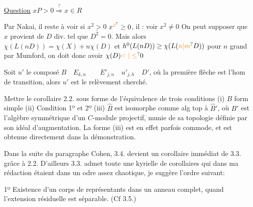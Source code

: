 \uline{Question} \quad $xP>0\overset{?}{\Longrightarrow}x\in R$

Par Nakai, il reste à voir si $\underline{x^2>0}$  $x^{\unsure{2}}\geq0$, il  : voir $x^2\ne0$ On peut supposer que $x$ provient de $D$ div. tel que $D^2=0$. Mais alors $\chi(L(nD))=\chi(X)+n\chi(D)$ et $h^0(L(nD))\geq\chi(L(\unsure{n|m}D))$ pour $n$ grand par Mumford, on doit donc avoir $\chi(D)\unsure{<|\leq}0$

Soit $u'$ le composé  $B\quad E_{k,n}\qquad E'_{j,n}\quad u'_{j,h}\quad D'$, où la première flêche est l'hom de transition, alors $u'$ est le relèvement cherché.

Mettre le corollaire 2.2. sous forme de l'équivalence de trois conditions (i) $B$ form simple (ii) Condition 1º et 2º (iii) $\hat B$ est isomorphe comme alg top à $\hat B'$, où $B'$ est l'algèbre symmétrique d'un $C$-module projectif, munie de  sa topologie définie par son idéal d'augmentation. La forme (iii) est en effet parfois commode, et est obtenue directement dans la démonstration.


Dans la suite du paragraphe Cohen, 3.4. devient un corollaire immédiat de 3.3. grâce à 2.2. D'ailleurs 3.3. admet toute une kyrielle de corollaires qui dans ma rédaction étaient dans un odre assez chaotique, je suggère  l'ordre suivant:

1º Existence d'un corps de représentants dans un anneau  complet, quand l'extension résiduelle est séparable. (Cf 3.5.)


